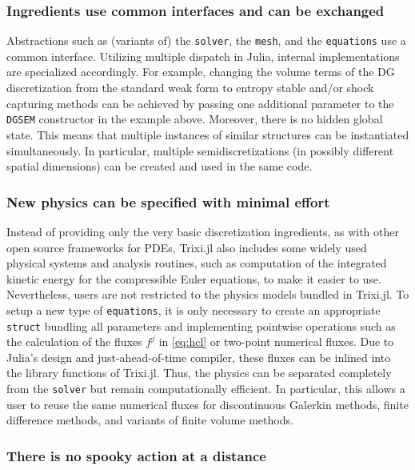 \documentclass{juliacon}
\newcommand{\trixi}{Trixi.jl\xspace}
\begin{document}
\subsubsection{Ingredients use common interfaces and can be exchanged}

Abstractions such as (variants of) the \lstinline{solver}, the \lstinline{mesh},
and the \lstinline{equations} use a common interface. Utilizing multiple
dispatch in Julia, internal implementations are specialized accordingly. For
example, changing the volume terms of the DG discretization from the standard
weak form to entropy stable and/or shock capturing methods can be achieved by
passing one additional parameter to the \lstinline{DGSEM} constructor in the
example above. Moreover, there is no hidden global state. This means that multiple instances
of similar structures can be instantiated simultaneously. In particular, multiple
semidiscretizations (in possibly different spatial dimensions) can be created
and used in the same code.

\subsubsection{New physics can be specified with minimal effort}

Instead of providing only the very basic discretization ingredients, as with
other open source frameworks for PDEs, \trixi also includes some widely used
physical systems and analysis routines, such as computation of the integrated kinetic energy
for the compressible Euler equations,
to make it easier to use. Nevertheless, users are not restricted
to the physics models bundled in \trixi. To setup a new type of \lstinline{equations},
it is only necessary to create an appropriate \lstinline{struct} bundling all
parameters and implementing pointwise operations such as the calculation of
the fluxes $f^j$ in \eqref{eq:hcl} or two-point numerical fluxes. Due to Julia's
design and just-ahead-of-time compiler, these fluxes can be inlined into the
library functions of \trixi. Thus, the physics can be separated completely from
the \lstinline{solver} but remain computationally efficient. In particular, this allows
a user to reuse the same numerical fluxes for discontinuous Galerkin methods, finite
difference methods, and variants of finite volume methods.

\subsubsection{There is no spooky action at a distance}
\end{document}

